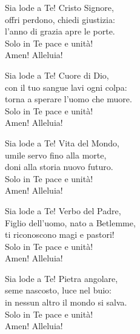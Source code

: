 

\spazio

\strofa Sia lode a Te! Cristo Signore,\\
offri perdono, chiedi giustizia:\\
l'anno di grazia apre le porte.\\
Solo in Te pace e unità!\\
Amen! Alleluia!

\spazio


\spazio

\strofa Sia lode a Te! Cuore di Dio,\\
con il tuo sangue lavi ogni colpa:\\
torna a sperare l'uomo che muore.\\
Solo in Te pace e unità!\\
Amen! Alleluia!

\spazio


\spazio

\strofa Sia lode a Te! Vita del Mondo,\\
umile servo fino alla morte,\\
doni alla storia nuovo futuro.\\
Solo in Te pace e unità!\\
Amen! Alleluia!

\spazio


\spazio

\strofa  Sia lode a Te! Verbo del Padre,\\
Figlio dell'uomo, nato a Betlemme,\\
ti riconoscono magi e pastori!\\
Solo in Te pace e unità!\\
Amen! Alleluia!

\spazio


\spazio

\strofa  Sia lode a Te! Pietra angolare,\\
seme nascosto, luce nel buio:\\
in nessun altro il mondo si salva.\\
Solo in Te pace e unità!\\
Amen! Alleluia!

\spazio

